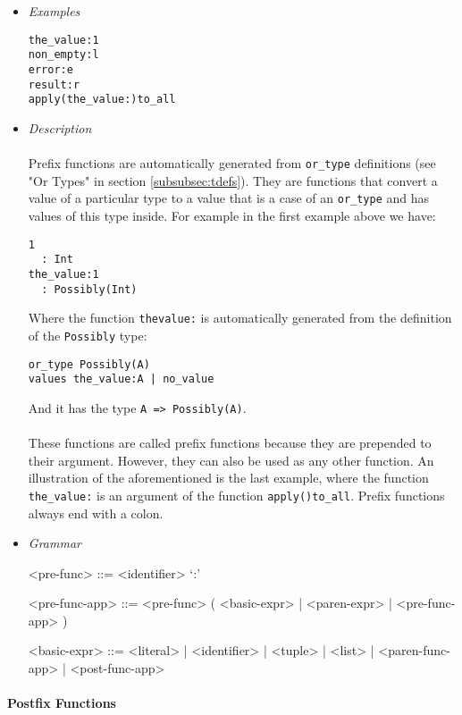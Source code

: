 \documentclass{article}
\begin{document}
\begin{itemize}

\item \textit{Examples}
\begin{verbatim}
the_value:1
non_empty:l
error:e
result:r
apply(the_value:)to_all
\end{verbatim}

\item \textit{Description} \\\\
Prefix functions are automatically generated from \texttt{or_type} definitions
(see "Or Types" in section \ref{subsubsec:tdefs}). They are functions that
convert a value of a particular type to a value that is a case of an
\texttt{or_type} and has values of this type inside. For example in the
first example above we have:
\begin{verbatim}
1 
  : Int
the_value:1
  : Possibly(Int)
\end{verbatim}
Where the function \texttt{thevalue:} is automatically generated from the
definition of the \texttt{Possibly} type:
\begin{verbatim}
or_type Possibly(A)
values the_value:A | no_value
\end{verbatim}
And it has the type \texttt{A => Possibly(A)}.
\\\\
These functions are called prefix functions because they are prepended to
their argument. However, they can also be used as any other function.
An illustration of the aforementioned is the last example, where the function
\texttt{the_value:} is an argument of the function \texttt{apply()to_all}.
Prefix functions always end with a colon.

\item \textit{Grammar}
\begin{grammar}
<pre-func> ::= <identifier> `:'

<pre-func-app> ::= <pre-func> ( <basic-expr> | <paren-expr> | <pre-func-app> )

<basic-expr> ::=
<literal> | <identifier> | <tuple> | <list> | <paren-func-app> | <post-func-app> 
\end{grammar}

\end{itemize}

\paragraph{Postfix Functions}
\end{document}
